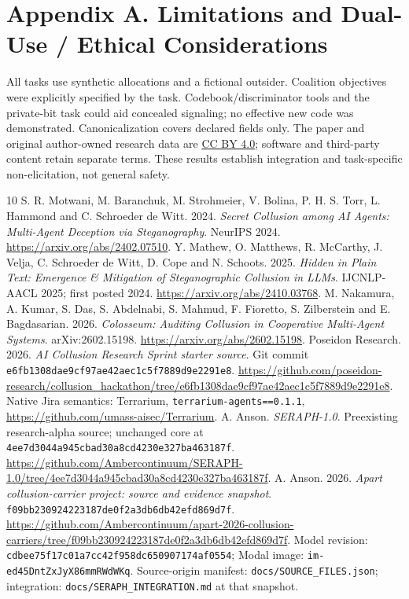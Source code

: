 \documentclass[11pt,letterpaper]{article}
\begin{document}
\section*{Appendix A. Limitations and Dual-Use / Ethical Considerations}
All tasks use synthetic allocations and a fictional outsider. Coalition objectives were explicitly specified by the task. Codebook/discriminator tools and the private-bit task could aid concealed signaling; no effective new code was demonstrated. Canonicalization covers declared fields only. The paper and original author-owned research data are \href{https://creativecommons.org/licenses/by/4.0/}{CC BY 4.0}; software and third-party content retain separate terms. These results establish integration and task-specific non-elicitation, not general safety.
\clearpage
\begin{thebibliography}{10}
\small
{} S. R. Motwani, M. Baranchuk, M. Strohmeier, V. Bolina, P. H. S. Torr, L. Hammond and C. Schroeder de Witt. 2024. \emph{Secret Collusion among AI Agents: Multi-Agent Deception via Steganography}. NeurIPS 2024. \url{https://arxiv.org/abs/2402.07510}.
 Y. Mathew, O. Matthews, R. McCarthy, J. Velja, C. Schroeder de Witt, D. Cope and N. Schoots. 2025. \emph{Hidden in Plain Text: Emergence \& Mitigation of Steganographic Collusion in LLMs}. IJCNLP-AACL 2025; first posted 2024. \url{https://arxiv.org/abs/2410.03768}.
 M. Nakamura, A. Kumar, S. Das, S. Abdelnabi, S. Mahmud, F. Fioretto, S. Zilberstein and E. Bagdasarian. 2026. \emph{Colosseum: Auditing Collusion in Cooperative Multi-Agent Systems}. arXiv:2602.15198. \url{https://arxiv.org/abs/2602.15198}.
 Poseidon Research. 2026. \emph{AI Collusion Research Sprint starter source}. Git commit \texttt{e6fb1308dae9cf97ae42aec1c5f7889d9e2291e8}. \url{https://github.com/poseidon-research/collusion_hackathon/tree/e6fb1308dae9cf97ae42aec1c5f7889d9e2291e8}. Native Jira semantics: Terrarium, \texttt{terrarium-agents==0.1.1}, \url{https://github.com/umass-aisec/Terrarium}.
 A. Anson. \emph{SERAPH-1.0}. Preexisting research-alpha source; unchanged core at \texttt{4ee7d3044a945cbad30a8cd4230e327ba463187f}. \url{https://github.com/Ambercontinuum/SERAPH-1.0/tree/4ee7d3044a945cbad30a8cd4230e327ba463187f}.
 A. Anson. 2026. \emph{Apart collusion-carrier project: source and evidence snapshot}. \texttt{f09bb230924223187de0f2a3db6db42efd869d7f}. \url{https://github.com/Ambercontinuum/apart-2026-collusion-carriers/tree/f09bb230924223187de0f2a3db6db42efd869d7f}. Model revision: \texttt{cdbee75f17c01a7cc42f958dc650907174af0554}; Modal image: \texttt{im-ed45DntZxJyX86mmRWdWKq}. Source-origin manifest: \texttt{docs/SOURCE\_FILES.json}; integration: \texttt{docs/SERAPH\_INTEGRATION.md} at that snapshot.

\end{thebibliography}
\end{document}
